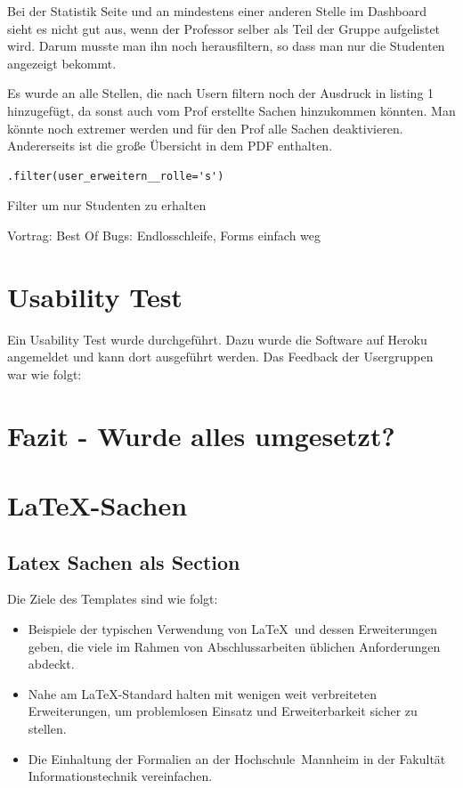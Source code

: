 \documentclass[11pt,a4paper]{report}
\begin{document}
Bei der Statistik Seite und an mindestens einer anderen Stelle im Dashboard sieht es nicht gut aus, wenn der Professor selber als Teil der Gruppe aufgelistet wird. Darum musste man ihn noch herausfiltern, so dass man nur die Studenten angezeigt bekommt.

Es wurde an alle Stellen, die nach Usern filtern noch der Ausdruck in listing 1 hinzugefügt, da sonst auch vom Prof erstellte Sachen hinzukommen könnten. Man könnte noch extremer werden und für den Prof alle Sachen deaktivieren. Andererseits ist die große Übersicht in dem PDF enthalten.

\begin{listing}[htbp]
\begin{lstlisting}
.filter(user_erweitern__rolle='s')
\end{lstlisting}
\caption{Filter um nur Studenten zu erhalten}
\label{code:ggt}
\end{listing}


Vortrag: Best Of Bugs: Endlosschleife, Forms einfach weg


\chapter{Usability Test} \label{chap:use}

Ein Usability Test wurde durchgeführt. Dazu wurde die Software auf Heroku angemeldet und kann dort ausgeführt werden. Das Feedback der Usergruppen war wie folgt:



\chapter{Fazit - Wurde alles umgesetzt?} \label{chap:fazit}




\chapter{\LaTeX-Sachen} \label{chap:latex}
\section{Latex Sachen als Section}

Die Ziele des Templates sind wie folgt:
\begin{itemize}
\item Beispiele der typischen Verwendung von \LaTeX\ und dessen Erweiterungen 
  geben, die viele im Rahmen von Abschlussarbeiten üblichen Anforderungen 
  abdeckt.
\item Nahe am \LaTeX-Standard halten mit wenigen weit verbreiteten 
  Erweiterungen, um problemlosen Einsatz und Erweiterbarkeit sicher zu stellen.
\item Die Einhaltung der Formalien an der Hochschule~Mannheim in der
  Fakultät Informationstechnik vereinfachen.
\end{itemize}
\end{document}

